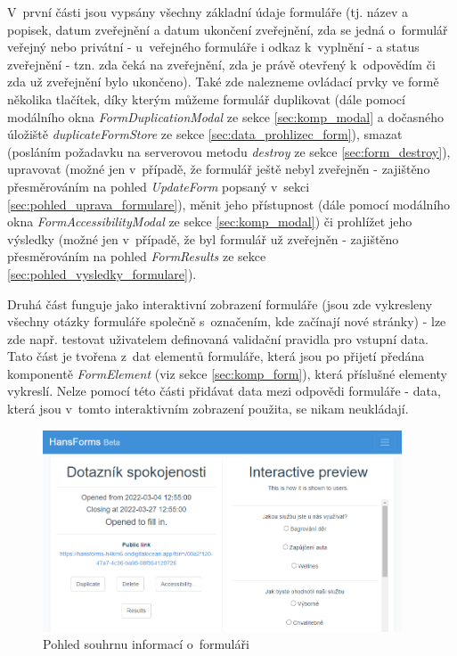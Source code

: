 		V~první části jsou vypsány všechny základní údaje formuláře (tj. název a popisek, datum zveřejnění a datum ukončení zveřejnění, zda se jedná o~formulář veřejný nebo privátní - u~veřejného formuláře i odkaz k~vyplnění - a status zveřejnění - tzn. zda čeká na zveřejnění, zda je právě otevřený k~odpovědím či zda už zveřejnění bylo ukončeno). Také zde nalezneme ovládací prvky ve formě několika tlačítek, díky kterým můžeme formulář duplikovat (dále pomocí modálního okna \textit{FormDuplicationModal} ze sekce \ref{sec:komp_modal} a dočasného úložiště \textit{duplicateFormStore} ze sekce \ref{sec:data_prohlizec_form}), smazat (posláním požadavku na serverovou metodu \textit{destroy} ze sekce \ref{sec:form_destroy}), upravovat (možné jen v~případě, že formulář ještě nebyl zveřejněn - zajištěno přesměrováním na pohled \textit{UpdateForm} popsaný v~sekci \ref{sec:pohled_uprava_formulare}), měnit jeho přístupnost (dále pomocí modálního okna \textit{FormAccessibilityModal} ze sekce \ref{sec:komp_modal}) či prohlížet jeho výsledky (možné jen v~případě, že byl formulář už zveřejněn - zajištěno přesměrováním na pohled \textit{FormResults} ze sekce \ref{sec:pohled_vysledky_formulare}).
		
		Druhá část funguje jako interaktivní zobrazení formuláře (jsou zde vykresleny všechny otázky formuláře společně s~označením, kde začínají nové stránky) - lze zde např. testovat uživatelem definovaná validační pravidla pro vstupní data. Tato část je tvořena z~dat elementů formuláře, která jsou po přijetí předána komponentě \textit{FormElement} (viz sekce \ref{sec:komp_form}), která příslušné elementy vykreslí. Nelze pomocí této části přidávat data mezi odpovědi formuláře - data, která jsou v~tomto interaktivním zobrazení použita, se nikam neukládají.
		
		\begin{figure}[h]
			\centering
			\includegraphics[width=0.95\textwidth]{img/pohledy/formpreview.png}
			\caption{Pohled souhrnu informací o~formuláři}
			\label{fig:pohled_formpreview}
		\end{figure}
		
